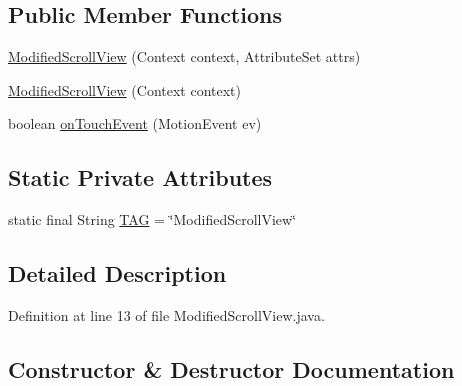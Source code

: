 \subsection*{Public Member Functions}
\begin{DoxyCompactItemize}
\item 
\mbox{\hyperlink{classcom_1_1example_1_1trainawearapplication_1_1_modified_scroll_view_a54164bcc307ead282e4a872882790ba1}{Modified\+Scroll\+View}} (Context context, Attribute\+Set attrs)
\item 
\mbox{\hyperlink{classcom_1_1example_1_1trainawearapplication_1_1_modified_scroll_view_a60a3e71da3963714f6ec401034a80c6f}{Modified\+Scroll\+View}} (Context context)
\item 
boolean \mbox{\hyperlink{classcom_1_1example_1_1trainawearapplication_1_1_modified_scroll_view_a1183afa31872d9cddf72b967d2db4f12}{on\+Touch\+Event}} (Motion\+Event ev)
\end{DoxyCompactItemize}
\subsection*{Static Private Attributes}
\begin{DoxyCompactItemize}
\item 
static final String \mbox{\hyperlink{classcom_1_1example_1_1trainawearapplication_1_1_modified_scroll_view_aa8c3ba8f3bb238ac0f2d56e82757814a}{T\+AG}} = \char`\"{}Modified\+Scroll\+View\char`\"{}
\end{DoxyCompactItemize}


\subsection{Detailed Description}


Definition at line 13 of file Modified\+Scroll\+View.\+java.



\subsection{Constructor \& Destructor Documentation}
\mbox{\label{classcom_1_1example_1_1trainawearapplication_1_1_modified_scroll_view_a54164bcc307ead282e4a872882790ba1}} 
